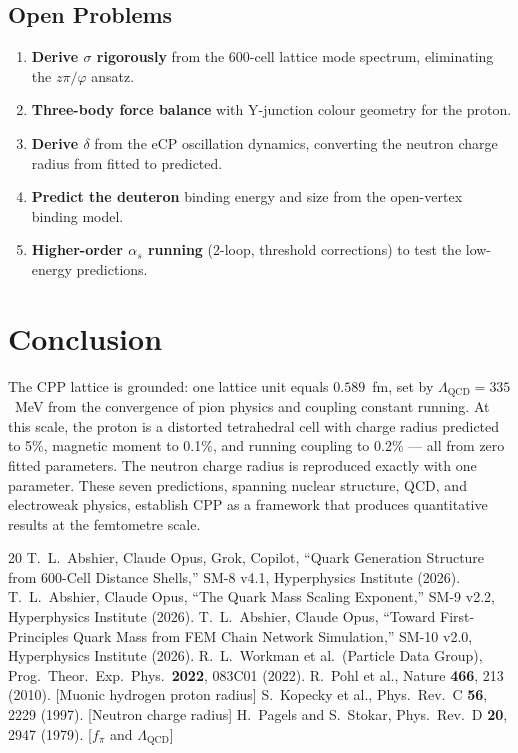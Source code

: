 \documentclass[12pt,a4paper]{article}
\begin{document}
\subsection{Open Problems}

\begin{enumerate}
\item \textbf{Derive $\sigma$ rigorously} from the 600-cell lattice mode spectrum, eliminating the $z\pi/\varphi$ ansatz.
\item \textbf{Three-body force balance} with Y-junction colour geometry for the proton.
\item \textbf{Derive $\delta$} from the eCP oscillation dynamics, converting the neutron charge radius from fitted to predicted.
\item \textbf{Predict the deuteron} binding energy and size from the open-vertex binding model.
\item \textbf{Higher-order $\alpha_s$ running} (2-loop, threshold corrections) to test the low-energy predictions.
\end{enumerate}

\section{Conclusion}

The CPP lattice is grounded: one lattice unit equals $0.589$~fm, set by $\Lambda_{\mathrm{QCD}} = 335$~MeV from the convergence of pion physics and coupling constant running. At this scale, the proton is a distorted tetrahedral cell with charge radius predicted to 5\%, magnetic moment to 0.1\%, and running coupling to 0.2\% --- all from zero fitted parameters. The neutron charge radius is reproduced exactly with one parameter. These seven predictions, spanning nuclear structure, QCD, and electroweak physics, establish CPP as a framework that produces quantitative results at the femtometre scale.

\begin{thebibliography}{20}
 T.~L.~Abshier, Claude Opus, Grok, Copilot, ``Quark Generation Structure from 600-Cell Distance Shells,'' SM-8 v4.1, Hyperphysics Institute (2026).
 T.~L.~Abshier, Claude Opus, ``The Quark Mass Scaling Exponent,'' SM-9 v2.2, Hyperphysics Institute (2026).
 T.~L.~Abshier, Claude Opus, ``Toward First-Principles Quark Mass from FEM Chain Network Simulation,'' SM-10 v2.0, Hyperphysics Institute (2026).
 R.~L.~Workman et al.\ (Particle Data Group), Prog.\ Theor.\ Exp.\ Phys.\ \textbf{2022}, 083C01 (2022).
 R.~Pohl et al., Nature \textbf{466}, 213 (2010). [Muonic hydrogen proton radius]
 S.~Kopecky et al., Phys.\ Rev.\ C \textbf{56}, 2229 (1997). [Neutron charge radius]
 H.~Pagels and S.~Stokar, Phys.\ Rev.\ D \textbf{20}, 2947 (1979). [$f_\pi$ and $\Lambda_{\mathrm{QCD}}$]
\end{thebibliography}
\end{document}
